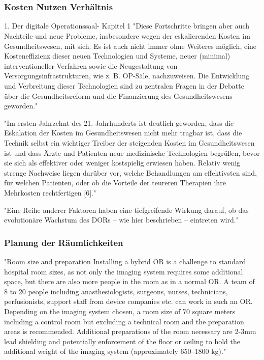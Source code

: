 \chapter{}
\label{sec:overview}

\subsection{Kosten Nutzen Verhältnis}
1. Der digitale Operationssaal- Kapitel 1
	"Diese Fortschritte bringen aber auch Nachteile und neue Probleme, insbesondere
	wegen der eskalierenden Kosten im Gesundheitswesen, mit sich. Es ist auch nicht
	immer ohne Weiteres möglich, eine Kosteneffizienz dieser neuen Technologien und
	Systeme, neuer (minimal) interventioneller Verfahren sowie die Neugestaltung von
	Versorgungsinfrastrukturen, wie z. B. OP-Säle, nachzuweisen. Die Entwicklung und
	Verbreitung dieser Technologien sind zu zentralen Fragen in der Debatte über die
	Gesundheitsreform und die Finanzierung des Gesundheitswesens geworden."
	
	"Im ersten Jahrzehnt des 21. Jahrhunderts ist deutlich geworden, dass die Eskalation
	der Kosten im Gesundheitswesen nicht mehr tragbar ist, dass die Technik selbst
	ein wichtiger Treiber der steigenden Kosten im Gesundheitswesen ist und dass Ärzte
	und Patienten neue medizinische Technologien begrüßen, bevor sie sich als effektiver
	oder weniger kostspielig erwiesen haben. Relativ wenig strenge Nachweise liegen
	darüber vor, welche Behandlungen am effektivsten sind, für welchen Patienten, oder
	ob die Vorteile der teureren Therapien ihre Mehrkosten rechtfertigen [6]."
	
	"Eine Reihe anderer Faktoren haben eine tiefgreifende Wirkung
	darauf, ob das evolutionäre Wachstum des DORs – wie hier beschrieben – eintreten
	wird."


\subsection{Planung der Räumlichkeiten}
	"Room size and preparation
	Installing a hybrid OR is a challenge to standard hospital room sizes, as not only the imaging system requires some additional space, but there are also more people in the room as in a normal OR. A team of 8 to 20 people including anasthesiologists, surgeons, nurses, technicians, perfusionists, support staff from device companies etc. can work in such an OR. Depending on the imaging system chosen, a room size of 70 square meters including a control room but excluding a technical room and the preparation areas is recommended. Additional preparations of the room necessary are 2-3mm lead shielding and potentially enforcement of the floor or ceiling to hold the additional weight of the imaging system (approximately 650–1800 kg)."
	
